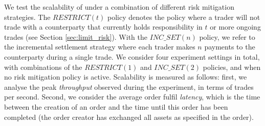 We test the scalability of \ModelName{} under a combination of different risk mitigation strategies.
The $ RESTRICT(t) $ policy denotes the policy where a trader will not trade with a counterparty that currently holds responsibility in $ t $ or more ongoing trades (see Section \ref{sec:limit_risk}).
With the $ INC\_SET(n) $ policy, we refer to the incremental settlement strategy where each trader makes $ n $ payments to the counterparty during a single trade.
We consider four experiment settings in total, with combinations of the $ RESTRICT(1) $ and $ INC\_SET(2) $ policies, and when no risk mitigation policy is active.
Scalability is measured as follows:
first, we analyse the peak \emph{throughput} observed during the experiment, in terms of trades per second.
Second, we consider the average order fulfil \emph{latency}, which is the time between the creation of an order and the time until this order has been completed (the order creator has exchanged all assets as specified in the order).

